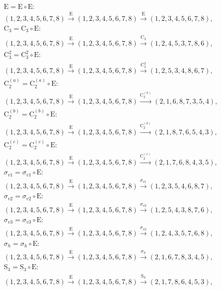 \begin{align*}
& \mathrm{E} = \mathrm{E} \circ \mathrm{E}:\; \\& (1,2,3,4,5,6,7,8) \xrightarrow{\mathrm{E}} (1,2,3,4,5,6,7,8) \xrightarrow{\mathrm{E}} (1,2,3,4,5,6,7,8), \\
& \mathrm{C}_{3} = \mathrm{C}_{3} \circ \mathrm{E}:\; \\& (1,2,3,4,5,6,7,8) \xrightarrow{\mathrm{E}} (1,2,3,4,5,6,7,8) \xrightarrow{\mathrm{C}_{3}} (1,2,4,5,3,7,8,6), \\
& \mathrm{C}_{3}^{2} = \mathrm{C}_{3}^{2} \circ \mathrm{E}:\; \\& (1,2,3,4,5,6,7,8) \xrightarrow{\mathrm{E}} (1,2,3,4,5,6,7,8) \xrightarrow{\mathrm{C}_{3}^{2}} (1,2,5,3,4,8,6,7), \\
& \mathrm{C}_{2}^{(a)} = \mathrm{C}_{2}^{(a)} \circ \mathrm{E}:\; \\& (1,2,3,4,5,6,7,8) \xrightarrow{\mathrm{E}} (1,2,3,4,5,6,7,8) \xrightarrow{\mathrm{C}_{2}^{(a)}} (2,1,6,8,7,3,5,4), \\
& \mathrm{C}_{2}^{(b)} = \mathrm{C}_{2}^{(b)} \circ \mathrm{E}:\; \\& (1,2,3,4,5,6,7,8) \xrightarrow{\mathrm{E}} (1,2,3,4,5,6,7,8) \xrightarrow{\mathrm{C}_{2}^{(b)}} (2,1,8,7,6,5,4,3), \\
& \mathrm{C}_{2}^{(c)} = \mathrm{C}_{2}^{(c)} \circ \mathrm{E}:\; \\& (1,2,3,4,5,6,7,8) \xrightarrow{\mathrm{E}} (1,2,3,4,5,6,7,8) \xrightarrow{\mathrm{C}_{2}^{(c)}} (2,1,7,6,8,4,3,5), \\
& \sigma_{v1} = \sigma_{v1} \circ \mathrm{E}:\; \\& (1,2,3,4,5,6,7,8) \xrightarrow{\mathrm{E}} (1,2,3,4,5,6,7,8) \xrightarrow{\sigma_{v1}} (1,2,3,5,4,6,8,7), \\
& \sigma_{v2} = \sigma_{v2} \circ \mathrm{E}:\; \\& (1,2,3,4,5,6,7,8) \xrightarrow{\mathrm{E}} (1,2,3,4,5,6,7,8) \xrightarrow{\sigma_{v2}} (1,2,5,4,3,8,7,6), \\
& \sigma_{v3} = \sigma_{v3} \circ \mathrm{E}:\; \\& (1,2,3,4,5,6,7,8) \xrightarrow{\mathrm{E}} (1,2,3,4,5,6,7,8) \xrightarrow{\sigma_{v3}} (1,2,4,3,5,7,6,8), \\
& \sigma_{h} = \sigma_{h} \circ \mathrm{E}:\; \\& (1,2,3,4,5,6,7,8) \xrightarrow{\mathrm{E}} (1,2,3,4,5,6,7,8) \xrightarrow{\sigma_{h}} (2,1,6,7,8,3,4,5), \\
& \mathrm{S}_{3} = \mathrm{S}_{3} \circ \mathrm{E}:\; \\& (1,2,3,4,5,6,7,8) \xrightarrow{\mathrm{E}} (1,2,3,4,5,6,7,8) \xrightarrow{\mathrm{S}_{3}} (2,1,7,8,6,4,5,3), \\

\end{align*}

